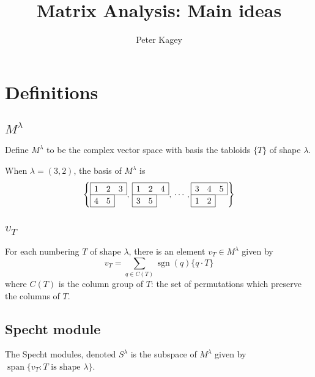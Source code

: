 \documentclass{article}
\newenvironment{example}[1][Example.]{\begin{trivlist}
\item[\hskip \labelsep {\bfseries #1}]}{\end{trivlist}}
\begin{document}
\title{Matrix Analysis: Main ideas}
\author{Peter Kagey}

\maketitle

\section{Definitions}
\subsection{$M^\lambda$}
  Define $M^\lambda$ to be the complex vector space with basis the tabloids
  $\{T\}$ of shape $\lambda$.
  \begin{example}
    When $\lambda = (3, 2)$, the basis of $M^\lambda$ is \[
      \left\{
      \begin{tikzpicture}[scale=0.5, baseline=-0.5ex]
        \draw (0,0) rectangle (3,1);
        \draw (0,-1) rectangle (2,0);
        \node at (0.5,0.5) {1};
        \node at (1.5,0.5) {2};
        \node at (2.5,0.5) {3};
        \node at (0.5,-0.5) {4};
        \node at (1.5,-0.5) {5};
      \end{tikzpicture},\,
      \begin{tikzpicture}[scale=0.5, baseline=-0.5ex]
        \draw (0,0) rectangle (3,1);
        \draw (0,-1) rectangle (2,0);
        \node at (0.5,0.5) {1};
        \node at (1.5,0.5) {2};
        \node at (2.5,0.5) {4};
        \node at (0.5,-0.5) {3};
        \node at (1.5,-0.5) {5};
      \end{tikzpicture},\,
      \cdots,
      \begin{tikzpicture}[scale=0.5, baseline=-0.5ex]
        \draw (0,0) rectangle (3,1);
        \draw (0,-1) rectangle (2,0);
        \node at (0.5,0.5) {3};
        \node at (1.5,0.5) {4};
        \node at (2.5,0.5) {5};
        \node at (0.5,-0.5) {1};
        \node at (1.5,-0.5) {2};
      \end{tikzpicture}
      \right\}
    \]
  \end{example}
  \subsection{$v_T$}
    For each numbering $T$ of shape $\lambda$, there is an element
    $v_T \in M^\lambda$ given by \[
      v_T = \sum_{q \in C(T)} \operatorname{sgn}(q)\{q \cdot T\}
    \] where $C(T)$ is the column group of $T$: the set of permutations which
    preserve the columns of $T$.
  \subsection{Specht module}
    The Specht modules, denoted $S^\lambda$ is the subspace of $M^\lambda$
    given by $\operatorname{span}\{v_T : T \text{ is shape } \lambda\}$.
\end{document}
